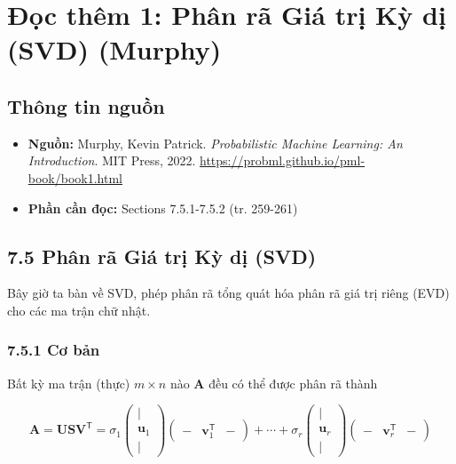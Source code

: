 \chapter{Đọc thêm 1: Phân rã Giá trị Kỳ dị (SVD) (Murphy)}
\label{ch:M3L4DT1}


\section{Thông tin nguồn}

\begin{itemize}
  \item \textbf{Nguồn:} Murphy, Kevin Patrick. \emph{Probabilistic Machine Learning: An Introduction}. MIT Press, 2022. \url{https://probml.github.io/pml-book/book1.html}
  \item \textbf{Phần cần đọc:} Sections 7.5.1-7.5.2 (tr. 259-261)
\end{itemize}

\section{7.5 Phân rã Giá trị Kỳ dị (SVD)}

Bây giờ ta bàn về SVD, phép phân rã tổng quát hóa phân rã giá trị riêng (EVD) cho các ma trận chữ nhật.

\subsection{7.5.1 Cơ bản}

Bất kỳ ma trận (thực) $m \times n$ nào $\mathbf{A}$ đều có thể được phân rã thành

\begin{equation}
\mathbf{A} = \mathbf{U}\mathbf{S}\mathbf{V}^{\mathsf{T}} = \sigma_1 \begin{pmatrix} | \\ \boldsymbol{u}_1 \\ | \end{pmatrix} \begin{pmatrix} - & \boldsymbol{v}_1^{\mathsf{T}} & - \end{pmatrix} + \cdots + \sigma_r \begin{pmatrix} | \\ \boldsymbol{u}_r \\ | \end{pmatrix} \begin{pmatrix} - & \boldsymbol{v}_r^{\mathsf{T}} & - \end{pmatrix}
\tag{7.178}
\end{equation}

